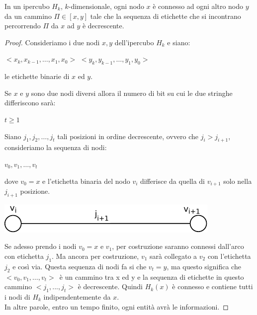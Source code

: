 \begin{prop}
    In un ipercubo $H_k$, $k$-dimensionale, ogni nodo $x$ è connesso
    ad ogni altro nodo $y$ da un cammino $\Pi \in [x,y]$ tale che la sequenza di
    etichette che si incontrano percorrendo $\Pi$ da $x$ ad $y$ è decrescente.
\end{prop}
\begin{proof}
    Consideriamo i due nodi $x,y$ dell'ipercubo $H_k$ e siano:
    \begin{center}
        $<x_k, x_{k-1}, \ldots, x_1,x_0>$ $<y_k, y_{k-1}, \ldots, y_1,y_0>$
    \end{center}
    le etichette binarie di $x$ ed $y$.

    Se $x$ e $y$ sono due nodi diversi allora il numero di bit su cui le due
    stringhe differiscono sarà:
    \begin{center}
        $t \geq 1$
    \end{center}

    Siano $j_1, j_2, \ldots, j_t$ tali posizioni in ordine decrescente, ovvero
    che $j_i > j_{i+1}$, consideriamo la sequenza di nodi:
    \begin{center}
        $v_0, v_1, \ldots ,v_t$
    \end{center}
    dove $v_0 = x$ e l'etichetta binaria del nodo $v_i$ differisce da quella di
    $v_{i+1}$ solo nella $j_{i+1}$ posizione.
    \begin{center}
        \includegraphics[scale=1]{images/n_12}
    \end{center}

    Se adesso prendo i nodi $v_0 = x $ e $v_1$, per costruzione saranno connessi
    dall'arco con etichetta $j_1$. Ma ancora per costruzione, $v_1$ sarà
    collegato a $v_2$ con l'etichetta $j_2$ e così via. Questa sequenza di nodi
    fa si che $v_t =  y$, ma questo significa che $<v_0, v_1, \ldots ,v_t>$\ è
    un cammino tra x ed y e la sequenza di etichette in questo cammino $<j_1,
        ..., j_t>$ è decrescente. Quindi $H_k(x)$ è connesso e contiene tutti i nodi
    di $H_k$ indipendentemente da $x$.\\
    In altre parole, entro un tempo finito, ogni entità avrà le informazioni.

\end{proof}

